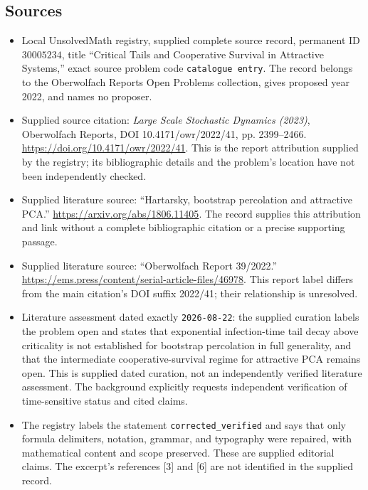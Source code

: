 \documentclass[11pt]{article}
\begin{document}
\subsection{Sources}
\begin{itemize}
\item Local UnsolvedMath registry, supplied complete source record, permanent ID \(30005234\), title ``Critical Tails and Cooperative Survival in Attractive Systems,'' exact source problem code \texttt{catalogue entry}. The record belongs to the Oberwolfach Reports Open Problems collection, gives proposed year 2022, and names no proposer.
\item Supplied source citation: \emph{Large Scale Stochastic Dynamics (2023)}, Oberwolfach Reports, DOI 10.4171/owr/2022/41, pp. 2399--2466. \url{https://doi.org/10.4171/owr/2022/41}. This is the report attribution supplied by the registry; its bibliographic details and the problem's location have not been independently checked.
\item Supplied literature source: ``Hartarsky, bootstrap percolation and attractive PCA.'' \url{https://arxiv.org/abs/1806.11405}. The record supplies this attribution and link without a complete bibliographic citation or a precise supporting passage.
\item Supplied literature source: ``Oberwolfach Report 39/2022.'' \url{https://ems.press/content/serial-article-files/46978}. This report label differs from the main citation's DOI suffix 2022/41; their relationship is unresolved.
\item Literature assessment dated exactly \texttt{2026-08-22}: the supplied curation labels the problem open and states that exponential infection-time tail decay above criticality is not established for bootstrap percolation in full generality, and that the intermediate cooperative-survival regime for attractive PCA remains open. This is supplied dated curation, not an independently verified literature assessment. The background explicitly requests independent verification of time-sensitive status and cited claims.
\item The registry labels the statement \texttt{corrected\_verified} and says that only formula delimiters, notation, grammar, and typography were repaired, with mathematical content and scope preserved. These are supplied editorial claims. The excerpt's references [3] and [6] are not identified in the supplied record.
\end{itemize}
\end{document}

